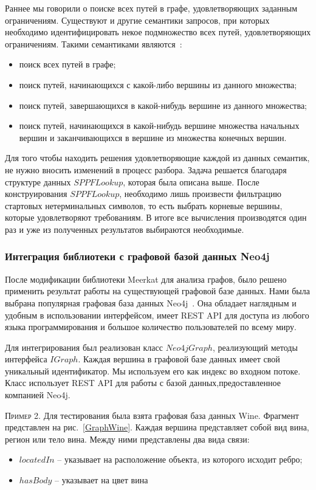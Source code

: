 Раннее мы говорили о поиске всех путей в графе, удовлетворяющих заданным ограничениям. Существуют и другие семантики запросов, при которых необходимо идентифицировать некое подмножество всех путей, удовлетворяющих ограничениям. Такими семантиками являются~\cite{Hellings}:

\begin{itemize}
\item поиск всех путей в графе;
\item поиск путей, начинающихся с какой-либо вершины из данного
множества;
\item поиск путей, завершающихся в какой-нибудь вершине из данного
множества;
\item поиск путей, начинающихся в какой-нибудь вершине множества
начальных вершин и заканчивающихся в вершине из множества
конечных вершин.
\end{itemize}

Для того чтобы находить решения удовлетворяющие каждой из данных семантик, не нужно вносить изменений в процесс разбора. Задача решается благодаря структуре данных $SPPFLookup$, которая была описана выше. После конструирования $SPPFLookup$, необходимо лишь произвести фильтрацию стартовых нетерминальных символов, то есть выбрать корневые вершины, которые удовлетворяют требованиям. В итоге все вычисления производятся один раз и уже из полученных результатов выбираются необходимые.

\subsubsection{Интеграция библиотеки с графовой базой данных Neo4j}


После модификации библиотеки Meerkat для анализа графов, было решено применить результат работы на существующей графовой базе
данных. Нами была выбрана популярная графовая база данных Neo4j~\cite{Neo4j}. Она обладает наглядным и удобным в использовании интерфейсом, имеет REST API для доступа из любого языка программирования и большое количество пользователей по всему миру.

 Для интегрирования был реализован класс $Neo4jGraph$, реализующий методы интерфейса $IGraph$. Каждая вершина в графовой базе данных имеет свой уникальный идентификатор. Мы используем его как индекс во входном потоке. Класс использует REST API для работы с базой данных,предоставленное компанией Neo4j.

 \textsc{Пример 2.} 
Для тестирования была взята графовая база данных Wine. Фрагмент представлен на рис.~\ref{GraphWine}. Каждая вершина представляет собой вид вина, регион или тело вина. Между ними представлены два вида связи: 
\begin{itemize}
\item $locatedIn$ – указывает на расположение объекта, из которого
исходит ребро;
\item $hasBody$ – указывает на цвет вина
\end{itemize}

